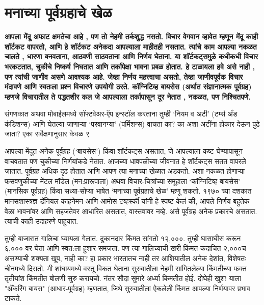 \chapter{मनाच्या पूर्वग्रहाचे खेळ}

\textcolor{blue!60!black}{\textbf{आपला मेंदू अफाट क्षमतेचा आहे , पण तो नेहमी तर्कशुद्ध नसतो. विचार वेगवान व्हावेत म्हणून मेंदू काही शॉर्टकट वापरतो, आणि हे शॉर्टकट अनेकदा आपल्याला माहीतही नसतात. त्यांचे काम आपल्या नकळत चालते , धारणा बनवताना, आठवणी साठवताना आणि निर्णय घेताना. या शॉर्टकट्समुळे कधीकधी विचार भरकटतात, चुकीचे निष्कर्ष निघतात आणि तर्कापेक्षा भावना प्रबळ होतात. हे टाळायला हवे असे नाही , पण त्यांची जाणीव असणे आवश्यक आहे. जेव्हा निर्णय महत्त्वाचा असतो, तेव्हा जाणीवपूर्वक विचार मंदावणे आणि स्वतःला प्रश्न विचारणे उपयोगी ठरते. कॉग्निटिव्ह बायसेस (अर्थात संज्ञानात्मक पूर्वग्रह) म्हणजे विचारातील ते पद्धतशीर कल जे आपल्याला तर्कापासून दूर नेतात , नकळत, पण निश्चितपणे.}}

संगणकात अथवा मोबाईलमध्ये सॉफ्टवेअर-ऍप इन्स्टॉल करताना तुम्ही ‘नियम व अटी’ (टर्म्स अँड कंडिशन्स) आणि घेतल्या जाणाऱ्या ‘परवानग्या’ (पर्मिशन्स) वाचता का? का अशा अटींना होकार देऊन पुढे जाता? एका सर्वेक्षणानुसार केवळ ९%

आपल्या मेंदूत अनेक पूर्वग्रह (‘बायसेस’) किंवा शॉर्टकट्स असतात, जे आपल्याला कष्ट घेण्यापासून वाचवतात पण चुकीच्या निर्णयांकडे नेतात. आजच्या धावपळीच्या जीवनात हे शॉर्टकट्स सतत वापरले जातात. पूर्वग्रह अधिक दृढ होतात आणि आपण त्या मनाच्या खेळात अडकतो. अशा नकळत होणाऱ्या फसवणुकीच्या मेंटल मॉडेल (मन:प्रारूपाला) अथवा विचार-चित्रांच्या समूहाला ‘कॉग्निटिव्ह बायसेस’ (मानसिक पूर्वग्रह) किंवा सध्या-सोप्या भाषेत ‘मनाच्या पूर्वग्रहाचे खेळ’ म्हणू शकतो. १९७० च्या दशकात मानसशास्त्रज्ञ डॅनियल काहनेमन आणि आमोस टव्हर्स्की यांनी हे स्पष्ट केलं की, आपले निर्णय बहुतेक वेळा भावनांवर आणि सहजतेवर आधारित असतात, वास्तवावर नव्हे. असे पूर्वग्रह अनेक प्रकारचे असतात. त्याची काही उदाहरणे पाहुयात. 

तुम्ही बाजारात गालिचा घ्यायला गेलात. दुकानदार किंमत सांगतो १२,०००. तुम्ही घासाघीस करून ६,००० वर घेता आणि स्वत:ला हुशार समजता. पण त्या गालिच्याची खरी किंमत कदाचित २,०००च असण्याची शक्यता खूप, नाही का?  हा प्रकार भारतातच नाही तर आशियातील अनेक देशांत, विशेषतः चीनमध्ये दिसतो. मी शांघायमध्ये वस्तू विकत घेताना सुरुवातीला नेहमी सांगितलेल्या किंमतीच्या फक्त तृतीयांश किंमतीत बोलणी सुरु करायचो. नंतर सौदा सुमारे अर्ध्या किमतीत होई. दोघेही खुश!  याला "अ‍ॅंकरिंग बायस" (आधार-पूर्वग्रह) म्हणतात, जिथे सुरुवातीला ऐकलेली किंमत आपल्या निर्णयावर प्रभाव टाकते. 

